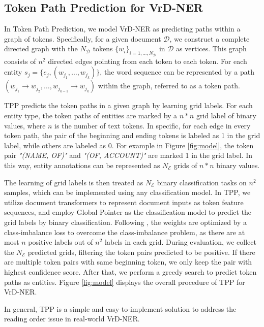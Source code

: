 \documentclass[11pt]{article}
\begin{document}
\subsection{Token Path Prediction for VrD-NER}

In Token Path Prediction, we model VrD-NER as predicting paths within a graph of tokens. 
Specifically, for a given document $\mathcal{D}$, we construct a complete directed graph with the $N_{\mathcal{D}}$ tokens $\{w_i\}_{i=1,\dots,N_{\mathcal{D}}}$ in $\mathcal{D}$ as vertices. This graph consists of $n^2$ directed edges pointing from each token to each token. 
For each entity $s_j=\{e_j,(w_{j_1},\dots,w_{j_k})\}$, the word sequence can be represented by a path $(w_{j_1}\to w_{j_2}, \dots, w_{j_{k-1}}\to w_{j_k})$ within the graph, referred to as a token path.

TPP predicts the token paths in a given graph by learning grid labels. 
For each entity type, the token paths of entities are marked by a $n*n$ grid label of binary values, where $n$ is the number of text tokens. 
In specific, for each edge in every token path, the pair of the beginning and ending tokens is labeled as 1 in the grid label, while others are labeled as 0. 
For example in Figure \ref{fig:model}, the token pair {\footnotesize \textit{"(NAME, OF)"}} and {\footnotesize \textit{"(OF, ACCOUNT)"}} are marked 1 in the grid label. 
In this way, entity annotations can be represented as $N_{\mathcal{E}}$ grids of $n*n$ binary values. 

The learning of grid labels is then treated as $N_{\mathcal{E}}$ binary classification tasks on $n^2$ samples, which can be implemented using any classification model. 
In TPP, we utilize document transformers to represent document inputs as token feature sequences, and employ Global Pointer \citep{su2022global} as the classification model to predict the grid labels by binary classification. Following \citep{su2022global}, the weights are optimized by a class-imbalance loss to overcome the class-imbalance problem, as there are at most $n$ positive labels out of $n^2$ labels in each grid. 
During evaluation, we collect the $N_{\mathcal{E}}$ predicted grids, filtering the token pairs predicted to be positive. If there are multiple token pairs with same beginning token, we only keep the pair with highest confidence score. After that, we perform a greedy search to predict token paths as entities. 
Figure \ref{fig:model} displays the overall procedure of TPP for VrD-NER. 

In general, TPP is a simple and easy-to-implement solution to address the reading order issue in real-world VrD-NER.
\end{document}
